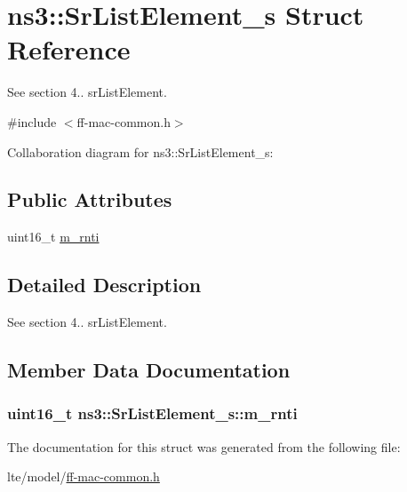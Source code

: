 \hypertarget{structns3_1_1SrListElement__s}{}\section{ns3\+:\+:Sr\+List\+Element\+\_\+s Struct Reference}
\label{structns3_1_1SrListElement__s}


See section 4.. sr\+List\+Element.  




{\ttfamily \#include $<$ff-\/mac-\/common.\+h$>$}



Collaboration diagram for ns3\+:\+:Sr\+List\+Element\+\_\+s\+:
\subsection*{Public Attributes}
\begin{DoxyCompactItemize}
\item 
uint16\+\_\+t \hyperlink{structns3_1_1SrListElement__s_a6bfb2793818e8be7ea2ae9415fb7cf09}{m\+\_\+rnti}
\end{DoxyCompactItemize}


\subsection{Detailed Description}
See section 4.. sr\+List\+Element. 

\subsection{Member Data Documentation}
\subsubsection[{\texorpdfstring{m\+\_\+rnti}{m_rnti}}]{\setlength{\rightskip}{0pt plus 5cm}uint16\+\_\+t ns3\+::\+Sr\+List\+Element\+\_\+s\+::m\+\_\+rnti}\hypertarget{structns3_1_1SrListElement__s_a6bfb2793818e8be7ea2ae9415fb7cf09}{}\label{structns3_1_1SrListElement__s_a6bfb2793818e8be7ea2ae9415fb7cf09}


The documentation for this struct was generated from the following file\+:\begin{DoxyCompactItemize}
\item 
lte/model/\hyperlink{ff-mac-common_8h}{ff-\/mac-\/common.\+h}\end{DoxyCompactItemize}
